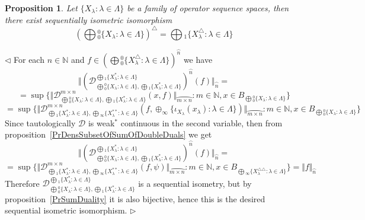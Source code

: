 \documentclass[12pt]{article}
\newtheorem{proposition}[theorem]{Proposition}
\newenvironment{proof}{\par $\triangleleft$}{$\triangleright$}
\begin{document}
\begin{proposition}\label{PrDualOfc0SumIsCoProd}
Let $ \{X_\lambda:\lambda\in \Lambda \}$ be a family 
of operator sequence spaces, then there exist sequentially 
isometric isomorphism
$$
{\left(\bigoplus{}_0^0 \{X_\lambda:\lambda\in \Lambda \}\right)}^\triangle
=\bigoplus{}_1 \{X_\lambda^\triangle:\lambda\in \Lambda \}
$$
\end{proposition}
\begin{proof}
For each $n\in\mathbb{N}$ and 
$f\in {\left(
    \bigoplus{}_0^0 \{X_\lambda^\triangle:\lambda\in \Lambda \}
\right)}^{\wideparen{n}}$ we have 
$$
\Vert
    {(
        \mathcal{D}_{
            \bigoplus{}_0^0 \{X_\lambda:\lambda\in\Lambda \},
            \bigoplus{}_1 \{X_\lambda^*:\lambda\in \Lambda \}
        }^{
            \bigoplus{}_1 \{X_\lambda^*:\lambda\in \Lambda \}
        }
    )}^{\wideparen{n}}(f)
\Vert_{\wideparen{n}}=
$$
$$=\sup \{
    \Vert
        \mathcal{D}_{
            \bigoplus{}_0^0 \{X_\lambda:\lambda\in \Lambda \},
            \bigoplus{}_1 \{X_\lambda^*:\lambda\in \Lambda \}
        }^{m\times n}(x,f)
    \Vert_{\wideparen{m\times n}}
    :m\in\mathbb{N}, 
    x\in B_{\bigoplus{}_0^0 \{X_\lambda:\lambda\in \Lambda \}}
 \}
$$
$$
=\sup \{
    \Vert
        \mathcal{D}_{
            \bigoplus{}_1 \{X_\lambda^*:\lambda\in \Lambda \},
            \bigoplus{}_\infty \{X_\lambda^{**}:\lambda\in \Lambda \}
        }^{m\times n}
        (
            f,
            \oplus_\infty \{
                \iota_{X_\lambda}(x_\lambda):\lambda\in\Lambda
             \})
    \Vert_{\wideparen{m\times n}}
    :m\in\mathbb{N}, 
    x\in B_{\bigoplus{}_0^0 \{X_\lambda:\lambda\in \Lambda \}}
 \}
$$
Since tautologically $\mathcal{D}$ is weak${}^*$ continuous in the second 
variable, then from proposition~\ref{PrDensSubsetOfSumOfDoubleDuals} we get
$$
\Vert
    {(
        \mathcal{D}_{
            \bigoplus{}_0^0  \{X_\lambda:\lambda\in \Lambda  \},
            \bigoplus{}_1  \{X_\lambda^*:\lambda\in \Lambda  \}
        }^{
            \bigoplus{}_1  \{X_\lambda^*:\lambda\in \Lambda  \}
        }
    )}^{\wideparen{n}}(f)
\Vert_{\wideparen{n}}=
$$
$$
=\sup \{
    \Vert
        \mathcal{D}_{
            \bigoplus{}_1 \{X_\lambda^*:\lambda\in \Lambda \},
            \bigoplus{}_\infty \{X_\lambda^{**}:\lambda\in \Lambda \}
        }^{m\times n}
        (
            f,
            \psi
        )
    \Vert_{\wideparen{m\times n}}
    :m\in\mathbb{N}, 
    x\in B_{
        \bigoplus{}_\infty \{
            X_\lambda^{\triangle\triangle}:\lambda\in \Lambda 
        \}
    }
 \}
=\Vert f\Vert_{\wideparen{n}}
$$
Therefore 
$\mathcal{D}_{
    \bigoplus{}_0^0 \{X_\lambda:\lambda\in \Lambda \},
    \bigoplus{}_1 \{X_\lambda^*:\lambda\in \Lambda \}
}^{
    \bigoplus{}_1 \{X_\lambda^*:\lambda\in \Lambda \}
}$ is a sequential isometry, but by proposition~\ref{PrSumDuality} it is also 
bijective, hence this is the desired sequential isometric isomorphism.
\end{proof}
\end{document}
